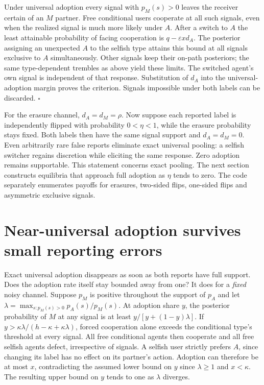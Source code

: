 \documentclass[11pt]{article}
\begin{document}
Under universal adoption every signal with $p_M(s)>0$ leaves the receiver certain of an $M$ partner. Free conditional users cooperate at all such signals, even when the realized signal is much more likely under $A$. After a switch to $A$ the least attainable probability of facing cooperation is $q-\varepsilon x d_A$. The posterior assigning an unexpected $A$ to the selfish type attains this bound at all signals exclusive to $A$ simultaneously. Other signals keep their on-path posteriors; the same type-dependent trembles as above yield these limits. The switched agent's own signal is independent of that response. Substitution of $d_A$ into the universal-adoption margin proves the criterion. Signals impossible under both labels can be discarded. \hfill$\square$

For the erasure channel, $d_A=d_M=\rho$. Now suppose each reported label is independently flipped with probability $0<\eta<1$, while the erasure probability stays fixed. Both labels then have the same signal support and $d_A=d_M=0$. Even arbitrarily rare false reports eliminate exact universal pooling: a selfish switcher regains discretion while eliciting the same response. Zero adoption remains supportable. This statement concerns exact pooling. The next section constructs equilibria that approach full adoption as $\eta$ tends to zero. The code separately enumerates payoffs for erasures, two-sided flips, one-sided flips and asymmetric exclusive signals.


\newpage
\section{Near-universal adoption survives small reporting errors}
Exact universal adoption disappears as soon as both reports have full support. Does the adoption rate itself stay bounded away from one? It does for a \emph{fixed} noisy channel. Suppose $p_M$ is positive throughout the support of $p_A$ and let $\lambda=\max_{s:p_M(s)>0}p_A(s)/p_M(s)$. At adoption share $y$, the posterior probability of $M$ at any signal is at least $y/[y+(1-y)\lambda]$. If $y>\kappa\lambda/(h-\kappa+\kappa\lambda)$, forced cooperation alone exceeds the conditional type's threshold at every signal. All free conditional agents then cooperate and all free selfish agents defect, irrespective of signals. A selfish user strictly prefers $A$, since changing its label has no effect on its partner's action. Adoption can therefore be at most $x$, contradicting the assumed lower bound on $y$ since $\lambda\ge1$ and $x<\kappa$. The resulting upper bound on $y$ tends to one as $\lambda$ diverges.
\end{document}

